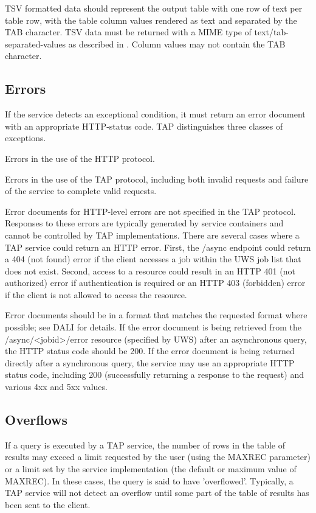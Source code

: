 \documentclass[11pt,letter]{ivoa}
\begin{document}
TSV formatted data should represent the output table with one row of text per 
table row, with the table column values rendered as text and separated by the 
TAB character. TSV data must be returned with a MIME type of 
text/tab-separated-values as described in
\citet{std:TSV}. Column values may not contain the 
TAB 
character.

\subsection{Errors}
\label{sec:query-error}

If the service detects an exceptional condition, it must return an error 
document with an appropriate HTTP-status code. TAP distinguishes three classes 
of exceptions.

Errors in the use of the HTTP protocol. 

Errors in the use of the TAP protocol, including both invalid requests and 
failure of the service to complete valid requests. 

Error documents for HTTP-level errors are not specified in the TAP protocol. 
Responses to these errors are typically generated by service containers and 
cannot be controlled by TAP implementations. There are several cases where a 
TAP 
service could return an HTTP error. First, the /async endpoint could return a 
404 (not found) error if the client accesses a job within the UWS job list that 
does not exist. Second, access to a resource could result in an HTTP 401 (not 
authorized) error if authentication is required or an HTTP 403 (forbidden) 
error if the client is not allowed to access the resource.

Error documents should be in a format that matches the requested
format where possible; see DALI for details. 
If the error document is being retrieved 
from the /async/<jobid>/error resource (specified by UWS) after an asynchronous 
query, the HTTP status code should be 200. If the error document is being 
returned directly after a synchronous query, the service may use an appropriate 
HTTP status code, including 200 (successfully returning a response to the 
request) and various 4xx and 5xx values.

\subsection{Overflows}
\label{sec:query-overflow}

If a query is executed by a TAP service, the number of rows in the table of 
results may exceed a limit requested by the user (using the MAXREC parameter) 
or a limit set by the service implementation (the default or maximum value of 
MAXREC). In these cases, the query is said to have 'overflowed'. Typically, a 
TAP service will not detect an overflow until some part of the table of results 
has been sent to the client.
\end{document}

